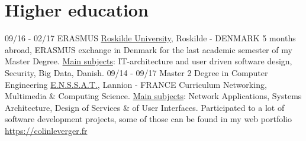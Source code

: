 \documentclass[]{friggeri-cv}
\begin{document}
\section{Higher education}
\vspace{-0.5em}

\begin{entrylist}
  \entry
  {09/16 - 02/17}
  {ERASMUS}
  {\href{http://www.ruc.dk/en/}{Roskilde University}, Roskilde - DENMARK}
  {5 months abroad, ERASMUS exchange in Denmark for the last academic semester of my Master Degree. \underline{Main subjects}: IT-architecture and user driven software design, Security, Big Data, Danish.}
  \entry
  {09/14 - 09/17}
  {Master 2 Degree in Computer Engineering}
  {\href{http://www.enssat.fr}{E.N.S.S.A.T.}, Lannion - FRANCE}
  {Curriculum Networking, Multimedia \& Computing Science. \underline{Main subjects}: Network Applications, Systems Architecture, Design of Services \& of User Interfaces. Participated to a lot of software development projects, some of those can be found in my web portfolio \href{https://colinleverger.fr}{https://colinleverger.fr}}
  \vspace{-2.5em}

\end{entrylist}

\end{document}
